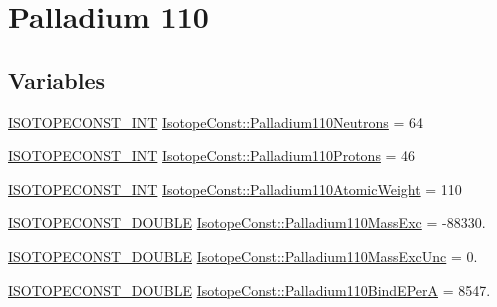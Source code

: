 \hypertarget{group___isotope_const-_palladium-_pd110}{}\section{Palladium 110}
\label{group___isotope_const-_palladium-_pd110}
\subsection*{Variables}
\begin{DoxyCompactItemize}
\item 
\mbox{\hyperlink{group___isotope_const-_macros_ga5f18360b3e99483a35c32d789e62621c}{I\+S\+O\+T\+O\+P\+E\+C\+O\+N\+S\+T\+\_\+\+I\+NT}} \mbox{\hyperlink{group___isotope_const-_palladium-_pd110_ga38da6159db7b3beca1e467775d2d7b1e}{Isotope\+Const\+::\+Palladium110\+Neutrons}} = 64
\item 
\mbox{\hyperlink{group___isotope_const-_macros_ga5f18360b3e99483a35c32d789e62621c}{I\+S\+O\+T\+O\+P\+E\+C\+O\+N\+S\+T\+\_\+\+I\+NT}} \mbox{\hyperlink{group___isotope_const-_palladium-_pd110_gab424a3944eda1a1bace1bac28e08362d}{Isotope\+Const\+::\+Palladium110\+Protons}} = 46
\item 
\mbox{\hyperlink{group___isotope_const-_macros_ga5f18360b3e99483a35c32d789e62621c}{I\+S\+O\+T\+O\+P\+E\+C\+O\+N\+S\+T\+\_\+\+I\+NT}} \mbox{\hyperlink{group___isotope_const-_palladium-_pd110_gaea156b66d5668612cc8b08f7145c0a60}{Isotope\+Const\+::\+Palladium110\+Atomic\+Weight}} = 110
\item 
\mbox{\hyperlink{group___isotope_const-_macros_ga8f45a7272ce02c0b4c65c44636ed719a}{I\+S\+O\+T\+O\+P\+E\+C\+O\+N\+S\+T\+\_\+\+D\+O\+U\+B\+LE}} \mbox{\hyperlink{group___isotope_const-_palladium-_pd110_ga96e15e057beca7fc81e819084664927a}{Isotope\+Const\+::\+Palladium110\+Mass\+Exc}} = -\/88330.
\item 
\mbox{\hyperlink{group___isotope_const-_macros_ga8f45a7272ce02c0b4c65c44636ed719a}{I\+S\+O\+T\+O\+P\+E\+C\+O\+N\+S\+T\+\_\+\+D\+O\+U\+B\+LE}} \mbox{\hyperlink{group___isotope_const-_palladium-_pd110_ga87b1ba6a69658bc25d645758e99b082e}{Isotope\+Const\+::\+Palladium110\+Mass\+Exc\+Unc}} = 0.
\item 
\mbox{\hyperlink{group___isotope_const-_macros_ga8f45a7272ce02c0b4c65c44636ed719a}{I\+S\+O\+T\+O\+P\+E\+C\+O\+N\+S\+T\+\_\+\+D\+O\+U\+B\+LE}} \mbox{\hyperlink{group___isotope_const-_palladium-_pd110_ga7ce3e004104e678e1c559917e9939d3e}{Isotope\+Const\+::\+Palladium110\+Bind\+E\+PerA}} = 8547.
\item 

\end{DoxyCompactItemize}
